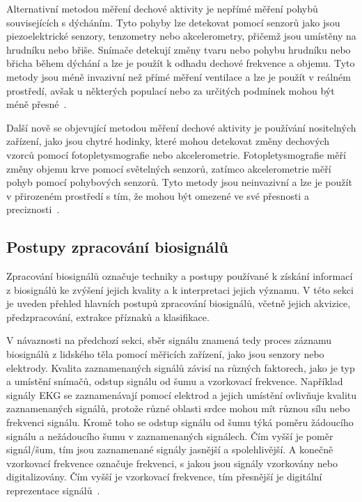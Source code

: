 Alternativní metodou měření dechové aktivity je nepřímé měření pohybů
souvisejících s dýcháním. Tyto pohyby lze detekovat pomocí senzorů jako jsou
piezoelektrické senzory, tenzometry nebo akcelerometry, přičemž jsou umístěny na
hrudníku nebo břiše. Snímače detekují změny tvaru nebo pohybu hrudníku nebo
břicha během dýchání a lze je použít k odhadu dechové frekvence a objemu. Tyto
metody jsou méně invazivní než přímé měření ventilace a lze je použít v reálném
prostředí, avšak u některých populací nebo za určitých podmínek mohou být méně
přesné~\cite{Massaroni2019,Massaroni2021,Fazio2021,Liu2019}.

Další nově se objevující metodou měření dechové aktivity je používání
nositelných zařízení, jako jsou chytré hodinky, které mohou detekovat změny
dechových vzorců pomocí fotopletysmografie nebo akcelerometrie.
Fotopletysmografie měří změny objemu krve pomocí světelných senzorů, zatímco
akcelerometrie měří pohyb pomocí pohybových senzorů. Tyto metody jsou
neinvazivní a lze je použít v přirozeném prostředí s tím, že mohou být omezené
ve své přesnosti a preciznosti~\cite{Massaroni2019,Massaroni2021,Fazio2021,
Leube2020,Liu2019,Nam2022,Zschocke2022}. 

\subsection{Postupy zpracování biosignálů}
\label{subsec:postupy_zpracovani_biosignalu}
Zpracování biosignálů označuje techniky a postupy používané k získání informací
z biosignálů ke zvýšení jejich kvality a k interpretaci jejich významu. V této
sekci je uveden přehled hlavních postupů zpracování biosignálů, včetně jejich
akvizice, předzpracování, extrakce příznaků a klasifikace. 

V návaznosti na předchozí sekci, sběr signálu znamená tedy proces záznamu
biosignálů z lidského těla pomocí měřicích zařízení, jako jsou senzory nebo
elektrody. Kvalita zaznamenaných signálů závisí na různých faktorech, jako je
typ a umístění snímačů, odstup signálu od šumu a vzorkovací frekvence. Například
signály EKG se zaznamenávají pomocí elektrod a jejich umístění ovlivňuje kvalitu
zaznamenaných signálů, protože různé oblasti srdce mohou mít různou sílu nebo
frekvenci signálu. Kromě toho se odstup signálu od šumu týká poměru žádoucího
signálu a nežádoucího šumu v zaznamenaných signálech. Čím vyšší je poměr
signál/šum, tím jsou zaznamenané signály jasnější a spolehlivější. A konečně
vzorkovací frekvence označuje frekvenci, s jakou jsou signály vzorkovány nebo
digitalizovány. Čím vyšší je vzorkovací frekvence, tím přesnější je digitální
reprezentace signálů~\cite{Escabi2005,Karagiannis2011}.

